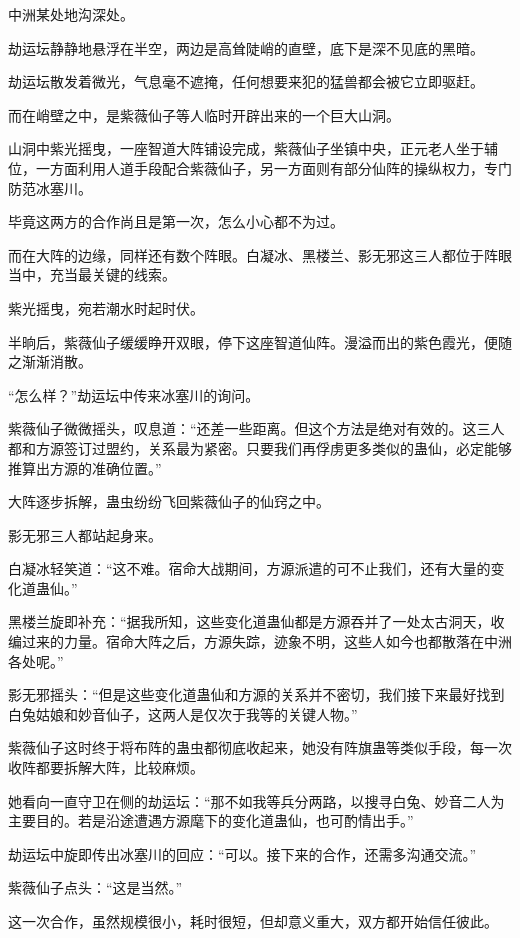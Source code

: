 
\begin{this_body}

中洲某处地沟深处。

劫运坛静静地悬浮在半空，两边是高耸陡峭的直壁，底下是深不见底的黑暗。

劫运坛散发着微光，气息毫不遮掩，任何想要来犯的猛兽都会被它立即驱赶。

而在峭壁之中，是紫薇仙子等人临时开辟出来的一个巨大山洞。

山洞中紫光摇曳，一座智道大阵铺设完成，紫薇仙子坐镇中央，正元老人坐于辅位，一方面利用人道手段配合紫薇仙子，另一方面则有部分仙阵的操纵权力，专门防范冰塞川。

毕竟这两方的合作尚且是第一次，怎么小心都不为过。

而在大阵的边缘，同样还有数个阵眼。白凝冰、黑楼兰、影无邪这三人都位于阵眼当中，充当最关键的线索。

紫光摇曳，宛若潮水时起时伏。

半晌后，紫薇仙子缓缓睁开双眼，停下这座智道仙阵。漫溢而出的紫色霞光，便随之渐渐消散。

“怎么样？”劫运坛中传来冰塞川的询问。

紫薇仙子微微摇头，叹息道：“还差一些距离。但这个方法是绝对有效的。这三人都和方源签订过盟约，关系最为紧密。只要我们再俘虏更多类似的蛊仙，必定能够推算出方源的准确位置。”

大阵逐步拆解，蛊虫纷纷飞回紫薇仙子的仙窍之中。

影无邪三人都站起身来。

白凝冰轻笑道：“这不难。宿命大战期间，方源派遣的可不止我们，还有大量的变化道蛊仙。”

黑楼兰旋即补充：“据我所知，这些变化道蛊仙都是方源吞并了一处太古洞天，收编过来的力量。宿命大阵之后，方源失踪，迹象不明，这些人如今也都散落在中洲各处呢。”

影无邪摇头：“但是这些变化道蛊仙和方源的关系并不密切，我们接下来最好找到白兔姑娘和妙音仙子，这两人是仅次于我等的关键人物。”

紫薇仙子这时终于将布阵的蛊虫都彻底收起来，她没有阵旗蛊等类似手段，每一次收阵都要拆解大阵，比较麻烦。

她看向一直守卫在侧的劫运坛：“那不如我等兵分两路，以搜寻白兔、妙音二人为主要目的。若是沿途遭遇方源麾下的变化道蛊仙，也可酌情出手。”

劫运坛中旋即传出冰塞川的回应：“可以。接下来的合作，还需多沟通交流。”

紫薇仙子点头：“这是当然。”

这一次合作，虽然规模很小，耗时很短，但却意义重大，双方都开始信任彼此。


\end{this_body}
